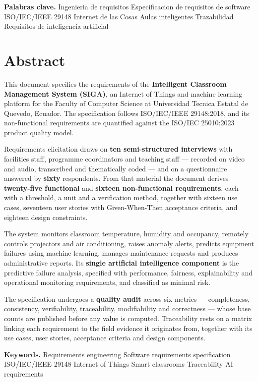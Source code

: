 \documentclass[11pt,a4paper]{article}
\begin{document}
\medskip
\noindent\textbf{Palabras clave.} Ingenieria de requisitos \textbullet{} Especificacion
de requisitos de software \textbullet{} ISO/IEC/IEEE 29148 \textbullet{} Internet de las
Cosas \textbullet{} Aulas inteligentes \textbullet{} Trazabilidad \textbullet{}
Requisitos de inteligencia artificial

\newpage

\section*{Abstract}

This document specifies the requirements of the \textbf{Intelligent Classroom Management
System (SIGA)}, an Internet of Things and machine learning platform for the Faculty of
Computer Science at Universidad Tecnica Estatal de Quevedo, Ecuador. The specification
follows ISO/IEC/IEEE 29148:2018, and its non-functional requirements are quantified
against the ISO/IEC 25010:2023 product quality model.

Requirements elicitation draws on \textbf{ten semi-structured interviews} with facilities
staff, programme coordinators and teaching staff --- recorded on video and audio,
transcribed and thematically coded --- and on a questionnaire answered by \textbf{sixty}
respondents. From that material the document derives \textbf{twenty-five functional} and
\textbf{sixteen non-functional requirements}, each with a threshold, a unit and a
verification method, together with sixteen use cases, seventeen user stories with
Given-When-Then acceptance criteria, and eighteen design constraints.

The system monitors classroom temperature, humidity and occupancy, remotely controls
projectors and air conditioning, raises anomaly alerts, predicts equipment failures using
machine learning, manages maintenance requests and produces administrative reports. Its
\textbf{single artificial intelligence component} is the predictive failure analysis,
specified with performance, fairness, explainability and operational monitoring
requirements, and classified as minimal risk.

The specification undergoes a \textbf{quality audit} across six metrics --- completeness,
consistency, verifiability, traceability, modifiability and correctness --- whose base
counts are published before any value is computed. Traceability rests on a matrix linking
each requirement to the field evidence it originates from, together with its use cases,
user stories, acceptance criteria and design components.

\medskip
\noindent\textbf{Keywords.} Requirements engineering \textbullet{} Software requirements
specification \textbullet{} ISO/IEC/IEEE 29148 \textbullet{} Internet of Things
\textbullet{} Smart classrooms \textbullet{} Traceability \textbullet{} AI requirements

\newpage
\tableofcontents
\newpage
\listoftables
\newpage
\listoffigures
\newpage


\end{document}
